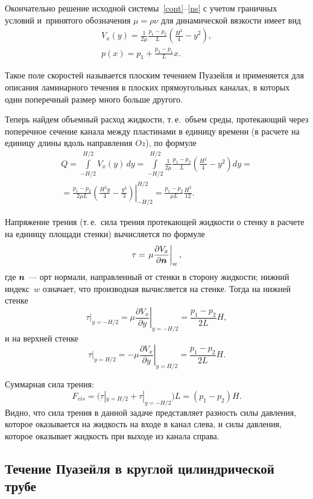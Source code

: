 \documentclass[12pt, a4paper]{article}
\renewcommand{\vec}[1]{\bi{#1}}
\begin{document}
Окончательно решение исходной системы~\eqref{cont}--\eqref{ns} с учетом граничных условий и~принятого обозначения $\mu = \rho \nu$ для динамической вязкости имеет вид
\begin{gather}\label{eq3}
V_x(y)=\frac{1}{2\mu}\frac{p_1-p_2}{L}\left(\frac{H^2}{4}-y^2\right),\\
p(x)=p_1 + \frac{p_2-p_1}{L}x.
\end{gather}

Такое поле скоростей называется плоским течением Пуазейля и применяется для описания ламинарного течения в плоских прямоугольных каналах, в которых один поперечный размер много больше другого.

Теперь найдем объемный расход жидкости, т.\,е.\ объем среды, протекающий через поперечное сечение канала между пластинами в единицу времени (в расчете на единицу длины вдоль направления $Oz$), по формуле
\begin{multline*}
 Q=\int\limits_{-H/2}^{H/2} V_x(y)\, dy = \int\limits_{-{H/2}}^{H/2}\frac{1}{2\mu}\frac{p_1-p_2}{L}\left(\frac{H^2}{4}-y^2\right) dy={}\\
 {}=\frac{p_1-p_2}{2\mu L}\left.\left(\frac{H^2y}{4}-\frac{y^3}{3}\right)\right|_{-H/2}^{H/2}=\frac{p_1-p_2}{\mu L}\frac{H^3}{12}.
\end{multline*}

Напряжение трения (т.\,е.\ сила трения протекающей жидкости о стенку в расчете на единицу площади стенки) вычисляется по формуле
\[
		\tau = \left.\mu\frac{\partial V_x}{\partial \vec n}\right|_w,
\]
где $\vec n$ --- орт нормали, направленный от стенки в сторону жидкости; нижний индекс~$w$ означает, что производная вычисляется на стенке.
Тогда на нижней стенке
\[
\tau|_{y=-H/2} = \left.\mu\frac{\partial V_x}{\partial y}\right|_{y=-H/2} = \frac{p_1-p_2}{2L}H,
\]
и на верхней стенке		
\[
 \tau|_{y= H/2} = \left.-\mu\frac{\partial V_x}{\partial y}\right|_{y=H/2} = \frac{p_1-p_2}{2L}H.
\]

Суммарная сила трения:
\[
F_{vis} = \bigl(\tau|_{y= H/2}+\tau|_{y=-H/2}\bigr)L=(p_1-p_2)H.
\]
Видно, что сила трения в данной задаче представляет разность силы давления, которое оказывается на жидкость на входе в канал слева, и силы давления, которое оказывает жидкость при выходе из канала справа.


\subsection{Течение Пуазейля в круглой цилиндрической трубе}
\end{document}
